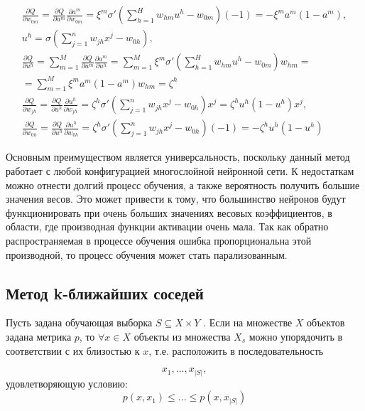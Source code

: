 \begin{enumerate}
\begin{itemize}
\begin{gather*}
                \frac{\partial Q}{\partial w_{0m}} = \frac{\partial Q}{\partial a^m}\frac{\partial a^m}{\partial w_{0m}} = \xi^m \sigma'(\sum_{h=1}^{H}w_{hm}u^h - w_{0m})(-1)= -\xi^m a^m (1 - a^m),\\
                u^h = \sigma(\sum_{j=1}^{n}w_{jh} x^j - w_{0h}),\\
                \frac{\partial Q}{\partial u^h} = \sum_{m=1}^{M} \frac{\partial Q}{\partial a^m}\frac{\partial a^m}{\partial u^h} = \sum_{m=1}^{M} \xi^m \sigma'(\sum_{h=1}^{H}w_{hm}u^h - w_{0m})w_{hm}=\\
                =\sum_{m=1}^{M}\xi^m a^m (1 - a^m) w_{hm} = \zeta^h\\
                \frac{\partial Q}{\partial w_{jh}} = \frac{\partial Q}{\partial u^h}\frac{\partial u^h}{\partial w_{jh}} = \zeta^h \sigma'(\sum_{j=1}^{n}w_{jh}x^j - w_{0h}) x^j= \zeta^h u^h (1 - u^h)x^j,\\
                \frac{\partial Q}{\partial w_{0h}} = \frac{\partial Q}{\partial u^h}\frac{\partial u^h}{\partial w_{0h}} = \zeta^h \sigma'(\sum_{j=1}^{n}w_{jh}x^j - w_{0h})(-1)= -\zeta^h u^h (1 - u^h)
            \end{gather*}
    \end{itemize}

    Основным преимуществом является универсальность, поскольку данный метод работает с любой конфигурацией многослойной нейронной сети.
    К недостаткам можно отнести долгий процесс обучения, а также вероятность получить большие значения весов. Это может привести к
    тому, что большинство нейронов будут функционировать при очень больших значениях весовых коэффициентов, в области, где производная функции активации очень мала. Так как обратно распространяемая в процессе обучения ошибка пропорциональна этой 
    производной, то процесс обучения может стать парализованным.
\end{enumerate}

\subsection{Метод k-ближайших соседей}
Пусть задана обучающая выборка $S \subseteq X \times Y$ \cite[]{twelve}.
Если на множестве $X$ объектов задана метрика $p$, то $\forall x \in X$ объекты из множества $X_s$ можно упорядочить в соответствии с их близостью к $x$, т.е. расположить в последовательность

\begin{equation}
	\label{eq:nn34}
    x_1,...,x_{|S|},
\end{equation}
удовлетворяющую условию:
\begin{equation}
	\label{eq:nn35}
    p(x,x_1)\leq ... \leq p(x,x_{|S|})
\end{equation}

